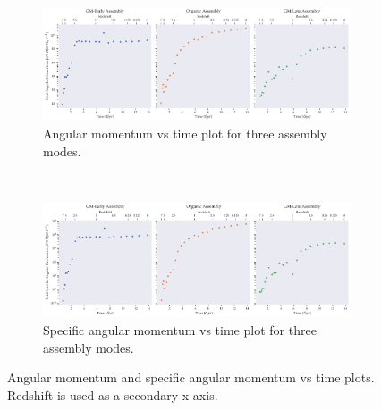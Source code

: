 \documentclass{article}
\begin{document}
	\begin{figure}
		\centering
		\begin{subfigure} {\columnwidth}
				\centering 
				\includegraphics[width=\columnwidth]{../../plots/angular_momentum/time-net_angular_momentum.png}
				\caption{Angular momentum vs time plot for three assembly modes.}
		\end{subfigure} \\
			\vspace{1cm}
		\begin{subfigure} {\columnwidth}
				\centering 
				\includegraphics[width=\columnwidth]{../../plots/angular_momentum/time-net_specific_angular_momentum.png}
				\caption{Specific angular momentum vs time plot for three assembly modes.}
		\end{subfigure}
		
		\caption{Angular momentum and specific angular momentum vs time plots. Redshift is used as a secondary x-axis.}
	\end{figure}
\end{document}
